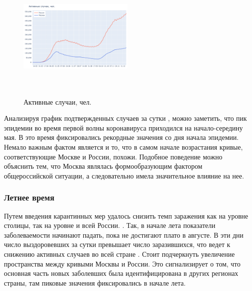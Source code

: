 \documentclass[a4paper, 12pt]{extarticle}
\begin{document}
\begin{figure}
    \centering
    \vspace{-20pt}
    \includegraphics[height=180pt, width=0.50\textwidth]{../plots/2active_cases_russia_moscow.pdf}
    \caption{Активные случаи, чел.}
    \label{fig:day_active_russia_moscow}
\end{figure}

Анализируя график подтвержденных случаев за сутки , можно заметить, что пик эпидемии во время первой волны коронавируса приходился на начало-середину мая. В это время фиксировались рекордные значения со дня начала эпидемии. Немало важным фактом является и то, что в самом начале возрастания кривые, соответствующие Москве и России, похожи. Подобное поведение можно объяснить тем, что Москва являлась формообразующим фактором общероссийской ситуации, а следовательно имела значительное влияние на нее.
\\
\vspace{5mm}

\subsubsection{Летнее время}
Путем введения карантинных мер удалось снизить темп заражения как на уровне
столицы, так на уровне и всей России. . Так, в начале лета показатели заболеваемости начинают падать, пока не достигают плато в августе. В эти дни число выздоровевших за сутки превышает число заразившихся, что ведет к снижению активных случаев во всей стране . Стоит подчеркнуть увеличение пространства между кривыми Москвы и России. Это сигнализирует о том, что основная часть новых заболевших была идентифицирована в других регионах страны, там пиковые значения фиксировались в начале лета.
\\
\end{document}
